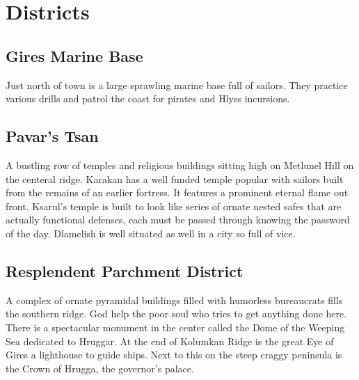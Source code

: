 \section{Districts}

\subsection{Gires Marine Base}

Just north of town is a large sprawling marine base full of sailors. They practice various drills and patrol the coast for pirates and Hlyss incursions.


\subsection{Pavar's Tsan}

A bustling row of temples and religious buildings sitting high on Metlunel Hill on the centeral ridge. Karakan has a well funded temple popular with sailors built from the remains of an earlier fortress. It features a prominent eternal flame out front. Ksarul's temple is built to look like series of ornate nested safes that are actually functional defenses, each must be passed through knowing the password of the day. Dlamelish is well situated as well in a city so full of vice.

\subsection{Resplendent Parchment District}

A complex of ornate pyramidal buildings filled with humorless bureaucrats fills the southern ridge. God help the poor soul who tries to get anything done here. There is a spectacular monument in the center called the Dome of the Weeping Sea dedicated to Hruggar. At the end of Kolumkan Ridge is the great Eye of Gires a lighthouse to guide ships. Next to this on the steep craggy peninsula is the Crown of Hrugga, the governor's palace.

